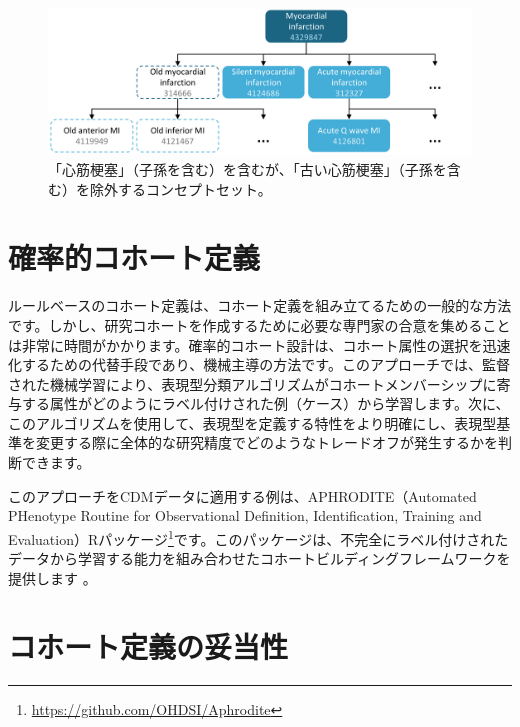 \documentclass[
  11pt]{book}
\theoremstyle{definition}
\theoremstyle{definition}
\theoremstyle{definition}
\theoremstyle{definition}
\theoremstyle{remark}
\begin{document}
\begin{figure}

{\centering \includegraphics[width=1\linewidth]{images/Cohorts/conceptSet} 

}

\caption{「心筋梗塞」（子孫を含む）を含むが、「古い心筋梗塞」（子孫を含む）を除外するコンセプトセット。}\label{fig:conceptSet}
\end{figure}

\section{確率的コホート定義}\label{ux78baux7387ux7684ux30b3ux30dbux30fcux30c8ux5b9aux7fa9}

ルールベースのコホート定義は、コホート定義を組み立てるための一般的な方法です。しかし、研究コホートを作成するために必要な専門家の合意を集めることは非常に時間がかかります。確率的コホート設計は、コホート属性の選択を迅速化するための代替手段であり、機械主導の方法です。このアプローチでは、監督された機械学習により、表現型分類アルゴリズムがコホートメンバーシップに寄与する属性がどのようにラベル付けされた例（ケース）から学習します。次に、このアルゴリズムを使用して、表現型を定義する特性をより明確にし、表現型基準を変更する際に全体的な研究精度でどのようなトレードオフが発生するかを判断できます。 

このアプローチをCDMデータに適用する例は、APHRODITE（Automated PHenotype Routine for Observational Definition, Identification, Training and Evaluation）Rパッケージ\footnote{\url{https://github.com/OHDSI/Aphrodite}}です。このパッケージは、不完全にラベル付けされたデータから学習する能力を組み合わせたコホートビルディングフレームワークを提供します \citep{Banda2017APHRODITE} 。

\section{コホート定義の妥当性}\label{ux30b3ux30dbux30fcux30c8ux5b9aux7fa9ux306eux59a5ux5f53ux6027}
\end{document}
